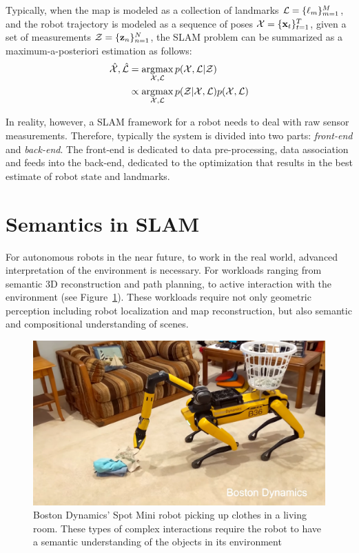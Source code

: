 Typically, when the map is modeled as a collection of landmarks $ \mathcal{L} = \{\ell_m\}_{m=1}^{M} $, and the robot trajectory is modeled as a sequence of poses $\mathcal{X} = \{\mathbf{x}_t\}_{t=1}^{T}$, given a set of measurements $ \mathcal{Z} = \{\mathbf{z}_n\}_{n=1}^{N}$, the SLAM problem can be summarized as a maximum-a-posteriori estimation \cite{dellaertFactorGraphsRobot2017} as follows:
\begin{align}
    \hat{\mathcal{X}}, \hat{\mathcal{L}} &= \operatorname*{\arg\!\max}_{\mathcal{X}, \mathcal{L}} p(\mathcal{X}, \mathcal{L} | \mathcal{Z}) \\
                         &\propto \operatorname*{\arg\!\max}_{\mathcal{X}, \mathcal{L}} p(\mathcal{Z} | \mathcal{X}, \mathcal{L}) p(\mathcal{X}, \mathcal{L})
\end{align}

In reality, however, a SLAM framework for a robot needs to deal with raw sensor measurements. Therefore, typically the system is divided into two parts: \emph{front-end} and \emph{back-end}. The front-end is dedicated to data pre-processing, data association and feeds into the back-end, dedicated to the optimization that results in the best estimate of robot state and landmarks.

\section{Semantics in SLAM}

For autonomous robots in the near future, to work in the real world, advanced interpretation of the environment is necessary. For workloads ranging from semantic 3D reconstruction and path planning, to active interaction with the environment (see Figure~\ref{fig:spot-mini}). These workloads require not only geometric perception including robot localization and map reconstruction, but also semantic and compositional understanding of scenes.

\begin{figure}[htpb]
    \centering
    \includegraphics[width=0.8\linewidth]{figs/Spots-Got-an-Arm.png}
    \caption{Boston Dynamics' Spot Mini robot picking up clothes in a living room. These types of complex interactions require the robot to have a semantic understanding of the objects in its environment}%
    \label{fig:spot-mini}
\end{figure}

